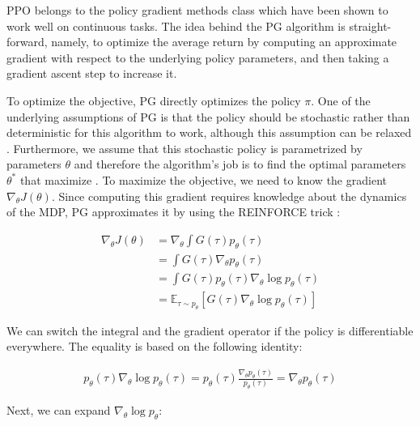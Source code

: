 \ac{PPO} belongs to the policy gradient methods class which have been shown to work well on continuous tasks. The idea behind the \ac{PG} algorithm is straight-forward, namely, to optimize the average return by computing an approximate gradient with respect to the underlying policy parameters, and then taking a gradient ascent step to increase it.

To optimize the objective, \ac{PG} directly optimizes the policy $\pi$. One of the underlying assumptions of \ac{PG} is that the policy should be stochastic rather than deterministic for this algorithm to work, although this assumption can be relaxed \cite{ddpg}. Furthermore, we assume that this stochastic policy is parametrized by parameters $\theta$ and therefore the algorithm's job is to find the optimal parameters $\theta^*$ that maximize . To maximize the objective, we need to know the gradient $\nabla_\theta J(\theta)$. Since computing this gradient requires knowledge about the dynamics of the \ac{MDP}, \ac{PG} approximates it by using the REINFORCE trick \cite{williams1992simple}:

\begin{align}
    \nabla_\theta J(\theta) &= \nabla_\theta \int G(\tau) p_\theta(\tau) \\
    &= \int G(\tau) \nabla_\theta p_\theta(\tau)\\
    &= \int G(\tau) p_\theta(\tau) \nabla_\theta \log p_\theta(\tau)\\
    &= \mathbb{E}_{\tau \sim p_\theta} \left[ G(\tau) \nabla_\theta \log p_\theta(\tau) \right]
    \label{eq:obj_grad}
\end{align}

We can switch the integral and the gradient operator if the policy is differentiable everywhere. The equality is based on the following identity:

\begin{align*}
    p_\theta(\tau)\nabla_\theta \log p_\theta(\tau) = p_\theta(\tau) \frac{\nabla_\theta p_\theta(\tau)}{p_\theta(\tau)} = \nabla_\theta p_\theta(\tau)
\end{align*}

Next, we can expand $\nabla_\theta \log p_\theta$:

